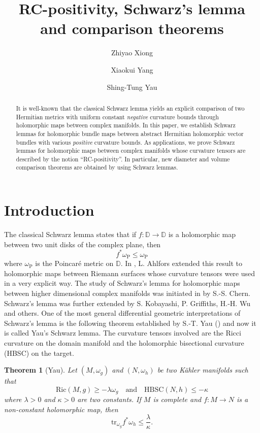 \documentclass[12pt]{amsart}
\title{RC-positivity,  Schwarz's lemma and comparison theorems}
\author{Zhiyao Xiong}
\author{Xiaokui Yang}
\author{Shing-Tung Yau}
\theoremstyle{plain}
\newtheorem{thm}{Theorem}[section]
\theoremstyle{definition}
\newcommand{\btheorem}{\begin{thm}}
\newcommand{\etheorem}{\end{thm}}
\newcommand{\beq}{\begin{equation}}
\newcommand{\eeq}{\end{equation}}
\newcommand{\qtq}[1]{\quad\mbox{#1}\quad}
\renewcommand{\>}{\rightarrow}
\newcommand{\D}{{\mathbb D}}
\newcommand{\Ric}{\mathrm{Ric}}
\newcommand{\om}{\omega}
\numberwithin{equation}{section} %
\begin{document}
    \begin{abstract} It is well-known that the classical Schwarz lemma yields an explicit comparison of two Hermitian metrics with uniform constant \emph{negative} curvature bounds  through  holomorphic maps between complex manifolds.
        In this paper, we establish  Schwarz lemmas for holomorphic bundle maps between abstract Hermitian holomorphic vector bundles with  various \emph{positive}  curvature bounds. As applications,  we prove Schwarz lemmas for holomorphic maps between complex manifolds whose curvature tensors are described by the notion ``RC-positivity''.   In particular, 
        new diameter and volume comparison theorems are obtained by using Schwarz lemmas.
    \end{abstract}


    \maketitle

\tableofcontents

\section{Introduction}

The classical Schwarz lemma states that if $f:\D\>\D$ is a holomorphic map between two unit disks of the complex plane, then
\beq
f^*\omega_{\mathrm{P}}\le \omega_{\mathrm{P}}\label{1.1}
\eeq
where $\omega_{\mathrm{P}}$ is the Poincar\'e metric on $\D$. In  \cite{Ahl38},  L. Ahlfors extended this result to holomorphic
maps between Riemann surfaces whose curvature tensors were used in a very explicit way.  The study of Schwarz's lemma for holomorphic maps between higher dimensional complex manifolds was initiated
in \cite{Che68} by S.-S. Chern. Schwarz's lemma was further extended by S. Kobayashi, P. Griffiths, H.-H. Wu and others.   One of the most
 general differential geometric  interpretations
of Schwarz's lemma is the following theorem established by S.-T. Yau (\cite{Yau78}) and now it is called Yau's Schwarz lemma. The curvature tensors involved are the Ricci curvature  on the domain manifold and the holomorphic bisectional curvature (HBSC) on the target.

\btheorem[Yau]\label{Yau}
Let $(M,\omega_g)$ and $(N,\omega_h)$ be two K\"ahler manifolds such that
\beq
\Ric(M,g)\ge -\lambda\om_g\qtq{and}\mathrm{HBSC}(N,h)\le -\kappa
\eeq
where $\lambda>0$ and $\kappa>0$ are two constants. If $M$ is complete and $f:M\to N$ is a non-constant holomorphic map, then
\beq
\mathrm{tr}_{\omega_g} f^*\omega_h\le\frac{\lambda}{\kappa}.\label{Yau0}
\eeq
\etheorem
\end{document}
